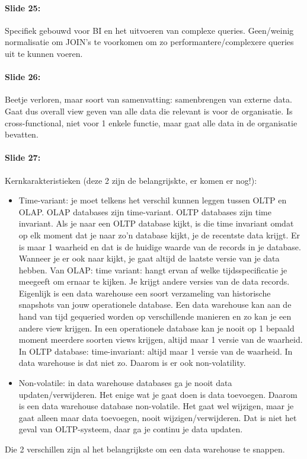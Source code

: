 \documentclass[10pt,a4paper]{report}
\begin{document}
\paragraph{Slide 25:}Specifiek gebouwd voor BI en het uitvoeren van complexe queries. Geen/weinig normalisatie om JOIN's te voorkomen om zo performantere/complexere queries uit te kunnen voeren.

\paragraph{Slide 26:}Beetje verloren, maar soort van samenvatting: samenbrengen van externe data. Gaat dus overall view geven van alle data die relevant is voor de organisatie. Is cross-functional, niet voor 1 enkele functie, maar gaat alle data in de organisatie bevatten.

\paragraph{Slide 27:}Kernkarakteristieken (deze 2 zijn de belangrijskte, er komen er nog!):
\begin{itemize}
\item Time-variant: je moet telkens het verschil kunnen leggen tussen OLTP en OLAP. OLAP databases zijn time-variant. OLTP databases zijn time invariant. Als je naar een OLTP database kijkt, is die time invariant omdat op elk moment dat je naar zo'n database kijkt, je de recentste data krijgt. Er is maar 1 waarheid en dat is de huidige waarde van de records in je database. Wanneer je er ook naar kijkt, je gaat altijd de laatste versie van je data hebben. Van OLAP: time variant: hangt ervan af welke tijdsspecificatie je meegeeft om ernaar te kijken. Je krijgt andere versies van de data records. Eigenlijk is een data warehouse een soort verzameling van historische snapshots van jouw operationele database. Een data warehouse kan aan de hand van tijd gequeried worden op verschillende manieren  en zo kan je een andere view krijgen. In een operationele database kan je nooit op 1 bepaald moment meerdere soorten views krijgen, altijd maar 1 versie van de waarheid. In OLTP database: time-invariant: altijd maar 1 versie van de waarheid. In data warehouse is dat niet zo. Daarom is er ook non-volatility.
\item Non-volatile: in data warehouse databases ga je nooit data updaten/verwijderen. Het enige wat je gaat doen is data toevoegen. Daarom is een data warehouse database non-volatile. Het gaat wel wijzigen, maar je gaat alleen maar data toevoegen, nooit wijzigen/verwijderen. Dat is niet het geval van OLTP-systeem, daar ga je continu je data updaten.
\end{itemize}
Die 2 verschillen zijn al het belangrijkste om een data warehouse te snappen.
\end{document}
